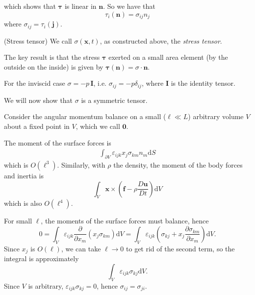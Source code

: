 \documentclass{article}
\begin{document}
which shows that $ \boldsymbol \tau $ is linear in $ \mathbf n $. So we have that
\[
	\tau_i(\mathbf n) = \sigma_{ij} n_j
\]
where $ \sigma_{ij} = \tau_i(\mathbf j) $.
\begin{definition}
	(Stress tensor) We call $ \sigma(\mathbf x,t) $, as constructed above, the \textit{stress tensor}.
\end{definition}
The key result is that the stress $ \boldsymbol\tau $ exerted on a small area element (by the outside on the inside) is given by $ \boldsymbol\tau(\mathbf n) = \sigma\cdot \mathbf n $.\par
For the inviscid case $ \sigma = -p\,\mathbf I $, i.e. $ \sigma_{ij} = -p\delta_{ij} $, where $ \mathbf I $ is the identity tensor.
\par
We will now show that $ \sigma $ is a symmetric tensor.
\par
Consider the angular momentum balance on a small ($ \ell \ll L $) arbitrary volume $ V $ about a fixed point in $ V $, which we call $ \mathbf 0 $.
\par
The moment of the surface forces is
\begin{align*}
	\int_{\partial V} \varepsilon_{ijk} x_j \sigma_{km}n_m \mathrm dS
\end{align*}
which is $ O(\ell^3) $. Similarly, with $ \rho $ the density, the moment of the body forces and inertia is
\[
  \int_V \mathbf x \times \left(\mathbf f - \rho\frac{D\mathbf u}{Dt}\right) \mathrm dV
\]
which is also $ O(\ell^4) $.
\par
For small $ \ell $, the moments of the surface forces must balance, hence
\[
   0 = \int_V \varepsilon_{ijk}\frac{\partial }{\partial x_m} (x_j \sigma_{km} )\mathrm dV = \int_V \varepsilon_{ijk}\left(\sigma_{kj} + x_j \frac{\partial \sigma_{km}}{\partial x_m}\right)\mathrm dV.
\]
Since $ x_j $ is $ O(\ell) $, we can take $ \ell \to 0 $ to get rid of the second term, so the integral is approximately
\[
	\int_V \varepsilon_{ijk} \sigma_{kj} \mathrm dV.
\]
Since $ V $ is arbitrary, $ \varepsilon_{ijk} \sigma_{kj} = 0 $, hence $ \sigma_{ij} = \sigma_{ji} $.
\end{document}
